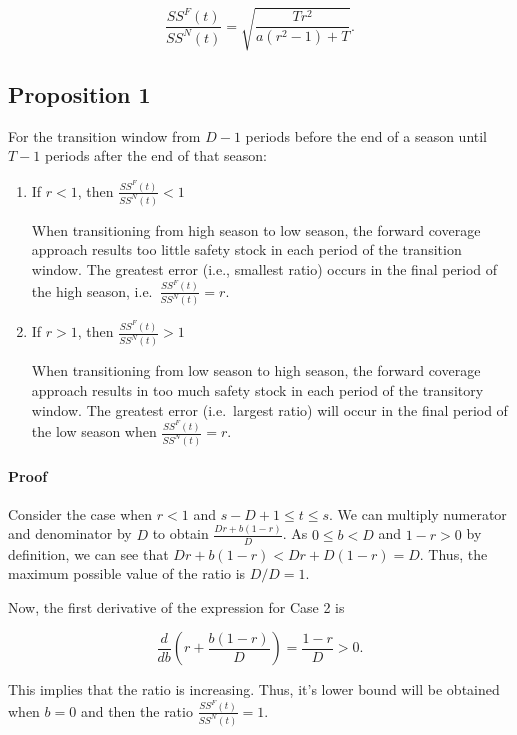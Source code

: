 \documentclass[,msom,nonblindrev]{informs}
\begin{document}
\[
\frac{SS^F(t)}{SS^N(t)} = \sqrt{\frac{Tr^2}{a(r^2 - 1) + T}}.
\]

\hypertarget{proposition-1}{%
\subsection{Proposition 1}\label{proposition-1}}

For the transition window from \(D-1\) periods before the end of a
season until \(T-1\) periods after the end of that season:

\begin{enumerate}
\def\labelenumi{\arabic{enumi}.}
\item
  If \(r<1\), then \(\frac{SS^F(t)}{SS^N(t)} < 1\)

  When transitioning from high season to low season, the forward
  coverage approach results too little safety stock in each period of
  the transition window. The greatest error (i.e., smallest ratio)
  occurs in the final period of the high season,
  i.e.~\(\frac{SS^F(t)}{SS^N(t)} = r\).
\item
  If \(r>1\), then \(\frac{SS^F(t)}{SS^N(t)} > 1\)

  When transitioning from low season to high season, the forward
  coverage approach results in too much safety stock in each period of
  the transitory window. The greatest error (i.e.~largest ratio) will
  occur in the final period of the low season when
  \(\frac{SS^F(t)}{SS^N(t)} = r\).
\end{enumerate}

\hypertarget{proof-1}{%
\paragraph{Proof}\label{proof-1}}

Consider the case when \(r < 1\) and \(s-D+1 \leq t \leq s\). We can
multiply numerator and denominator by \(D\) to obtain
\(\frac{Dr + b(1-r)}{D}\). As \(0 \leq b < D\) and \(1-r>0\) by
definition, we can see that \(Dr + b(1-r) < Dr + D(1-r) = D\). Thus, the
maximum possible value of the ratio is \(D/D = 1\).

Now, the first derivative of the expression for Case 2 is

\[
\frac{d}{db} \left(r + \frac{b(1-r)}{D}\right) = \frac{1-r}{D} > 0.
\]

This implies that the ratio is increasing. Thus, it's lower bound will
be obtained when \(b = 0\) and then the ratio
\(\frac{SS^F(t)}{SS^N(t)} = 1\).
\end{document}
